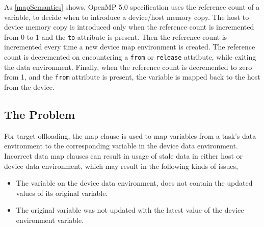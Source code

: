 As \autoref{mapSemantics} shows, OpenMP 5.0 specification uses the reference count of a variable, to decide when to introduce 
a device/host memory copy. The host to device memory copy is 
introduced only when the reference count is incremented from 0 to 1 and the \texttt{to} attribute is present. 
Then the reference count is incremented every time a 
new device map environment is created. 
The reference count is decremented on encountering a \texttt{from} or \texttt{release} 
attribute, while exiting the data environment. 
Finally, when the reference count is decremented to zero from 1, and the 
\texttt{from} attribute is present, 
the variable is mapped back to the host from the device.
\vspace{-10pt}
\subsection{The Problem}
For target offloading, the map clause is used to map variables from a 
task's data environment to the corresponding variable in the device 
data environment. Incorrect data map clauses can result in 
usage of 
stale data in either host or device data environment, 
which may result in the following kinds of issues, 

\begin{itemize}
 \item The variable on the device data environment, does not contain 
 the updated values of its original variable.
 \item The original variable was not updated with the latest value of 
 the device environment variable.
\end{itemize}


